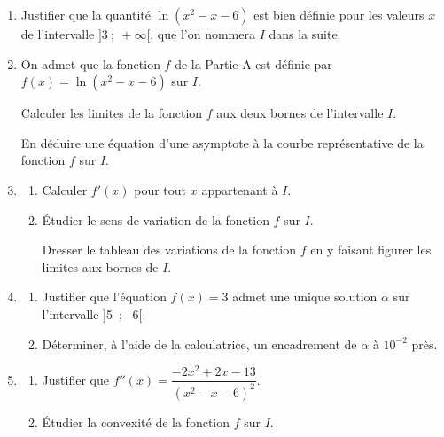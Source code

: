 \documentclass[10pt]{article}
\begin{document}
\begin{enumerate}
\item Justifier que la quantité $\ln \left(x^2- x- 6\right)$ est bien définie pour les valeurs $x$ de l'intervalle $]3~;~ +\infty[$, que l'on nommera $I$ dans la suite.
\item On admet que la fonction $f$ de la Partie A est définie par $f(x) = \ln \left(x^2- x- 6\right)$ sur $I$. 

Calculer les limites de la fonction $f$ aux deux bornes de l'intervalle $I$.

En déduire une équation d'une asymptote à la courbe représentative de la fonction $f$ sur $I$.
\item 
	\begin{enumerate}
		\item Calculer $f'(x)$ pour tout $x$ appartenant à $I$.
		\item Étudier le sens de variation de la fonction $f$ sur $I$.
		
Dresser le tableau des variations de la fonction $f$ en y faisant figurer les limites aux bornes de $I$.
	\end{enumerate}
\item 
	\begin{enumerate}
		\item Justifier que l'équation $f(x) = 3$ admet une unique solution $\alpha$ sur l'intervalle ]5~;~ 6[.
		\item Déterminer, à l'aide de la calculatrice, un encadrement de $\alpha$ à $10^{-2}$ près.
	\end{enumerate}
\item 
	\begin{enumerate}
		\item Justifier que $f''(x) = \dfrac{- 2x^2 + 2x - 13}{\left(x^2 - x - 6\right)^2}$.
		\item Étudier la convexité de la fonction $f$ sur $I$.
	\end{enumerate}
\end{enumerate}

\bigskip
\end{document}
